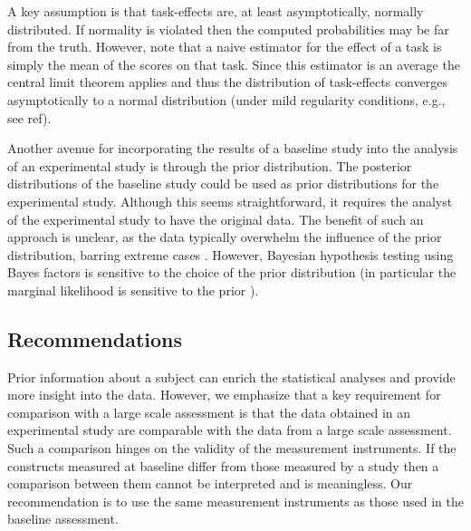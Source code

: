 \documentclass[a4paper]{article}
\newcommand{\DON}	[1] 	{\todo[linecolor=gray, backgroundcolor=white]	{Don: 	{#1}}}
\begin{document}
A key assumption is that task-effects are, at least asymptotically, normally distributed. If normality is violated then the computed probabilities may be far from the truth. However, note that a naive estimator for the effect of a task is simply the mean of the scores on that task.\DON{lookup ref if this estimator is unbiased!} Since this estimator is an average the central limit theorem applies and thus the distribution of task-effects converges asymptotically to a normal distribution (under mild regularity conditions, e.g., see ref).

Another avenue for incorporating the results of a baseline study into the analysis of an experimental study is through the prior distribution. The posterior distributions of the baseline study could be used as prior distributions for the experimental study. Although this seems straightforward, it requires the analyst of the experimental study to have the original data. The benefit of such an approach is unclear, as the data typically overwhelm the influence of the prior distribution, barring extreme cases \cite{Lynch2007}. However, Bayesian hypothesis testing using Bayes factors is sensitive to the choice of the prior distribution (in particular the marginal likelihood is sensitive to the prior ).


%
%
%

\subsection*{Recommendations}
Prior information about a subject can enrich the statistical analyses and provide more insight into the data. However, we emphasize that a key requirement for comparison with a large scale assessment is that the data obtained in an experimental study are comparable with the data from a large scale assessment. Such a comparison hinges on the validity of the measurement instruments. If the constructs measured at baseline differ from those measured by a study then a comparison between them cannot be interpreted and is meaningless. Our recommendation is to use the same measurement instruments as those used in the baseline assessment.
\end{document}
